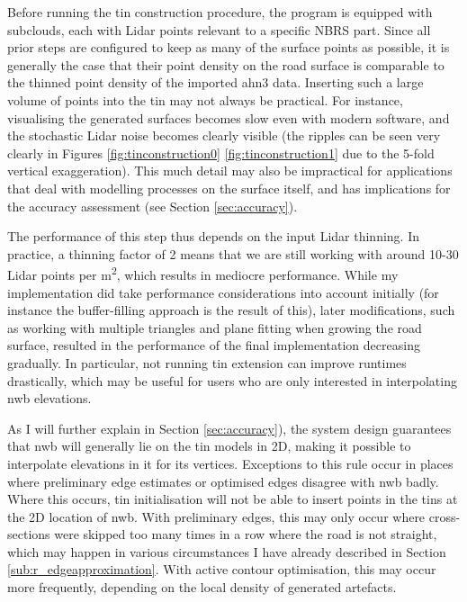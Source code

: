 Before running the \ac{tin} construction procedure, the program is equipped with subclouds, each with Lidar points relevant to a specific NBRS part. Since all prior steps are configured to keep as many of the surface points as possible, it is generally the case that their point density on the road surface is comparable to the thinned point density of the imported \ac{ahn3} data. Inserting such a large volume of points into the \ac{tin} may not always be practical. For instance, visualising the generated surfaces becomes slow even with modern software, and the stochastic Lidar noise becomes clearly visible (the ripples can be seen very clearly in Figures \ref{fig:tinconstruction0} \ref{fig:tinconstruction1} due to the 5-fold vertical exaggeration). This much detail may also be impractical for applications that deal with modelling processes on the surface itself, and has implications for the accuracy assessment (see Section \ref{sec:accuracy}).

The performance of this step thus depends on the input Lidar thinning. In practice, a thinning factor of 2 means that we are still working with around 10-30 Lidar points per m\textsuperscript{2}, which results in mediocre performance. While my implementation did take performance considerations into account initially (for instance the buffer-filling approach is the result of this), later modifications, such as working with multiple triangles and plane fitting when growing the road surface, resulted in the performance of the final implementation decreasing gradually. In particular, not running \ac{tin} extension can improve runtimes drastically, which may be useful for users who are only interested in interpolating \ac{nwb} elevations.

As I will further explain in Section \ref{sec:accuracy}), the system design guarantees that \ac{nwb} will generally lie on the \ac{tin} models in 2D, making it possible to interpolate elevations in it for its vertices. Exceptions to this rule occur in places where preliminary edge estimates or optimised edges disagree with \ac{nwb} badly. Where this occurs, \ac{tin} initialisation will not be able to insert points in the \ac{tin}s at the 2D location of \ac{nwb}. With preliminary edges, this may only occur where cross-sections were skipped too many times in a row where the road is not straight, which may happen in various circumstances I have already described in Section \ref{sub:r_edgeapproximation}. With active contour optimisation, this may occur more frequently, depending on the local density of generated artefacts.

